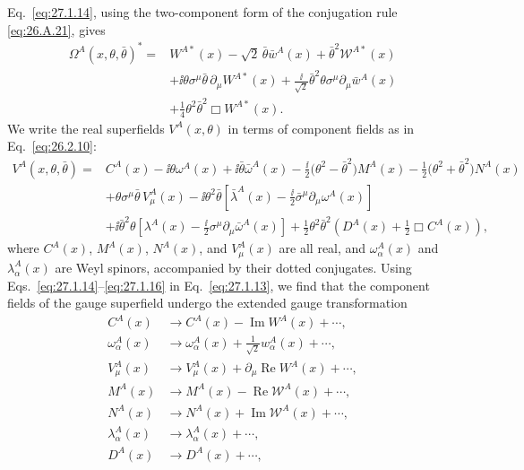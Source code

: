 Eq.~\eqref{eq:27.1.14}, using the two-component form of the conjugation
rule \eqref{eq:26.A.21}, gives
\begin{equation}
  \begin{aligned}
  \Omega^A(x,\theta,\bar\theta)^*={}&
  W^{A*}(x)
  -\sqrt{2}\,\bar\theta\bar w^A(x)
  +\bar\theta^2\mathcal{W}^{A*}(x)
  \\
  &+\ii\theta\sigma^\mu\bar\theta\,\partial_\mu W^{A*}(x)
  +\frac{\ii}{\sqrt{2}}\bar\theta^2
    \theta\sigma^\mu\partial_\mu\bar w^A(x)
  \\
  &+\frac14\theta^2\bar\theta^2\Box W^{A*}(x).
  \end{aligned}
  \tag{27.1.15}\label{eq:27.1.15}
\end{equation}
We write the real superfields \(V^A(x,\theta)\) in terms of component
fields as in Eq.~\eqref{eq:26.2.10}:
\begin{equation}
  \begin{aligned}
  V^A(x,\theta,\bar\theta)={}&C^A(x)
  -\ii\theta\omega^A(x)+\ii\bar\theta\bar\omega^A(x)
  -\frac{\ii}{2}\bigl(\theta^2-\bar\theta^2\bigr)M^A(x)
  -\frac12\bigl(\theta^2+\bar\theta^2\bigr)N^A(x)
  \\
  &+\theta\sigma^\mu\bar\theta\,V^A_\mu(x)
  -\ii\theta^2\bar\theta
    \left[\bar\lambda^A(x)
      -\frac{\ii}{2}\bar\sigma^\mu\partial_\mu\omega^A(x)\right]
  \\
  &+\ii\bar\theta^2\theta
    \left[\lambda^A(x)
      -\frac{\ii}{2}\sigma^\mu\partial_\mu\bar\omega^A(x)\right]
  +\frac12\theta^2\bar\theta^2
    \left(D^A(x)+\frac12\Box C^A(x)\right),
  \end{aligned}
  \tag{27.1.16}\label{eq:27.1.16}
\end{equation}
where \(C^A(x)\), \(M^A(x)\), \(N^A(x)\), and \(V^A_\mu(x)\) are all
real, and \(\omega^A_\alpha(x)\) and \(\lambda^A_\alpha(x)\) are Weyl
spinors, accompanied by their dotted conjugates.
Using Eqs.~\eqref{eq:27.1.14}--\eqref{eq:27.1.16} in
Eq.~\eqref{eq:27.1.13}, we find that the component fields of the gauge
superfield undergo the extended gauge transformation
\begin{equation}
  \begin{aligned}
  C^A(x)&\longrightarrow C^A(x)-\operatorname{Im}W^A(x)+\cdots,
  \\
  \omega^A_\alpha(x)&\longrightarrow
    \omega^A_\alpha(x)+\frac1{\sqrt{2}}w^A_\alpha(x)+\cdots,
  \\
  V^A_\mu(x)&\longrightarrow
    V^A_\mu(x)+\partial_\mu\operatorname{Re}W^A(x)+\cdots,
  \\
  M^A(x)&\longrightarrow
    M^A(x)-\operatorname{Re}\mathcal{W}^A(x)+\cdots,
  \\
  N^A(x)&\longrightarrow
    N^A(x)+\operatorname{Im}\mathcal{W}^A(x)+\cdots,
  \\
  \lambda^A_\alpha(x)&\longrightarrow\lambda^A_\alpha(x)+\cdots,
  \\
  D^A(x)&\longrightarrow D^A(x)+\cdots,
  \end{aligned}
  \tag{27.1.17}\label{eq:27.1.17}
\end{equation}
